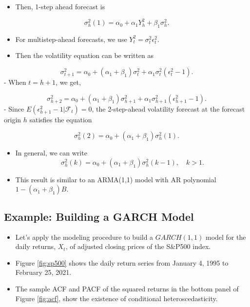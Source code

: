 \documentclass[]{book}
\providecommand{\tightlist}{%
  \setlength{\itemsep}{0pt}\setlength{\parskip}{0pt}}
\begin{document}
\begin{itemize}
\tightlist
\item
  Then, 1-step ahead forecast is
\end{itemize}

\[\sigma_{h}^2(1) = \alpha_0+\alpha_1Y_h^2+\beta_1\sigma_h^2.\]

\begin{itemize}
\tightlist
\item
  For multistep-ahead forecasts, we use \(Y_t^2 = \sigma_t^2\epsilon_t^2.\)
\item
  Then the volatility equation can be written as
\end{itemize}

\[\sigma_{t+1}^2 = \alpha_0+(\alpha_1+\beta_1)\sigma_t^2+\alpha_1\sigma_t^2(\epsilon_t^2-1).\]
- When \(t = h + 1\), we get,

\[\sigma_{h+2}^2 = \alpha_0+(\alpha_1+\beta_1)\sigma_{h+1}^2+\alpha_1\sigma_{h+1}^2(\epsilon_{h+1}^2-1).\]
- Since \(E(\epsilon_{h+1}^2-1|\mathcal{F}_t)=0\), the 2-step-ahead volatility forecast at the forecast origin \(h\) satisfies the equation

\[\sigma_{h}^2(2) = \alpha_0+(\alpha_1+\beta_1)\sigma_h^2(1).\]

\begin{itemize}
\item
  In general, we can write
  \[\sigma_{h}^2(k) = \alpha_0+(\alpha_1+\beta_1)\sigma_h^2(k-1), \quad k>1.\]
\item
  This result is similar to an ARMA(1,1) model with AR polynomial \(1 − (\alpha_1 + \beta_1)B\).
\end{itemize}

\hypertarget{example-building-a-garch-model}{%
\subsection{Example: Building a GARCH Model}\label{example-building-a-garch-model}}

\begin{itemize}
\tightlist
\item
  Let's apply the modeling procedure to build a \(GARCH(1,1)\) model for the daily returns, \(X_t\), of adjusted closing prices of the S\&P500 index.
\item
  Figure \ref{fig:sp500} shows the daily return series from January 4, 1995 to February 25, 2021.
\item
  The sample ACF and PACF of the squared returns in the bottom panel of Figure \ref{fig:acf}, show the existence of conditional heteroscedasticity.
\end{itemize}
\end{document}
